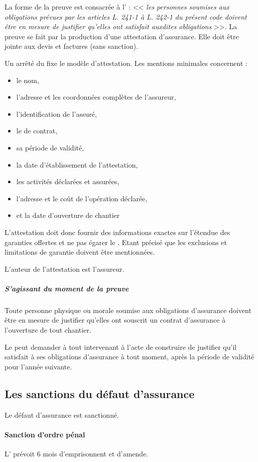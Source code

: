 		La forme de la preuve est consacrée à l’ : << {\itshape les personnes soumises aux obligations prévues par les articles L. 241-1 à L. 242-1 du présent code doivent être en mesure de justifier qu'elles ont satisfait auxdites obligations} >>. La preuve se fait par la production d'une attestation d'assurance. Elle doit être jointe aux devis et factures (sans sanction).

		Un arrêté du  fixe le modèle d’attestation. Les mentions minimales concernent :
		\begin{itemize}
			\item le nom,
			\item l’adresse et les coordonnées complètes de l’assureur,
			\item l’identification de l’assuré,
			\item le \no de contrat,
			\item sa période de validité,
			\item la date d’établissement de l’attestation,
			\item les activités déclarées et assurées,
			\item l’adresse et le coût de l’opération déclarée,
			\item et la date d’ouverture de chantier
		\end{itemize}
		L’attestation doit donc fournir des informations exactes sur l’étendue des garanties offertes et ne pas égarer le \MO.
		Etant précisé que les exclusions et limitations de garantie doivent être mentionnées.

		L’auteur de l’attestation est l’assureur.

		\subparagraph{S’agissant du moment de la preuve}
		Toute personne physique ou morale soumise aux obligations d’assurance doivent être en mesure de justifier qu’elles ont souscrit un contrat d’assurance à l’ouverture de tout chantier.

		Le \MO peut demander à tout intervenant à l’acte de construire de justifier qu’il satisfait à ses obligations d’assurance à tout moment, après la période de validité pour l’année suivante.


	\subsection{Les sanctions du défaut d'assurance}

		Le défaut d'assurance est sanctionné.

		\paragraph{Sanction d'ordre pénal}
			L' prévoit 6 mois d'emprisonnent et  d'amende.

